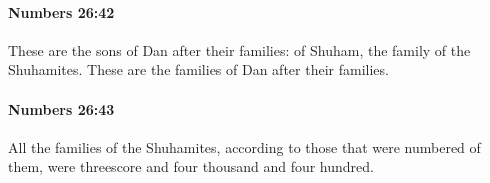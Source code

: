 		\paragraph{Numbers 26:42} %
			\label{NUMBERS-26-42}

			These are the sons of Dan after their families: of Shuham, the family of the Shuhamites. These are the families of Dan after their families.


		\paragraph{Numbers 26:43} %
			\label{NUMBERS-26-43}

			All the families of the Shuhamites, according to those that were numbered of them, were threescore and four thousand and four hundred.


